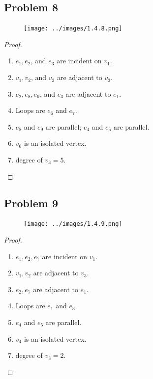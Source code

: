 \documentclass[14pt]{extarticle}
\begin{document}
\subsection{Problem 8}

\begin{figure}[ht!]
    \centering
    \texttt{[image: ../images/1.4.8.png]}
\end{figure}

\begin{proof}
    \begin{enumerate}
        \item $e_1, e_2$, and $e_3$ are incident on $v_1$.
        \item $v_1, v_2$, and $v_3$ are adjacent to $v_3$.
        \item $e_2, e_8, e_9$, and $e_3$ are adjacent to $e_1$.
        \item Loops are $e_6$ and $e_7$.
        \item $e_8$ and $e_9$ are parallel; $e_4$ and $e_5$ are parallel.
        \item $v_6$ is an isolated vertex.
        \item degree of $v_3 = 5$.
    \end{enumerate}
\end{proof}

\subsection{Problem 9}

\begin{figure}[ht!]
    \centering
    \texttt{[image: ../images/1.4.9.png]}
\end{figure}

\begin{proof}
    \begin{enumerate}
        \item $e_1, e_2, e_7$ are incident on $v_1$.
        \item $v_1, v_2$ are adjacent to $v_3$.
        \item $e_2, e_7$ are adjacent to $e_1$.
        \item Loops are $e_1$ and $e_3$.
        \item $e_4$ and $e_5$ are parallel.
        \item $v_4$ is an isolated vertex.
        \item degree of $v_3 = 2$.
    \end{enumerate}
\end{proof}
\end{document}
